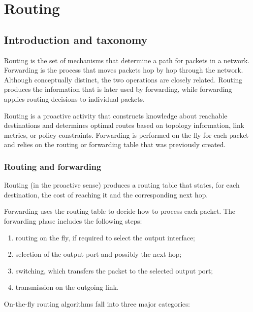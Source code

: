 \chapter{Routing}

\section{Introduction and taxonomy}

Routing is the set of mechanisms that determine a path for packets in a network. Forwarding is the process that moves packets hop by hop through the network. Although conceptually distinct, the two operations are closely related. Routing produces the information that is later used by forwarding, while forwarding applies routing decisions to individual packets.

Routing is a proactive activity that constructs knowledge about reachable destinations and determines optimal routes based on topology information, link metrics, or policy constraints. Forwarding is performed on the fly for each packet and relies on the routing or forwarding table that was previously created.

\subsection{Routing and forwarding}

Routing (in the proactive sense) produces a routing table that states, for each destination, the cost of reaching it and the corresponding next hop.

\begin{center}
\end{center}

Forwarding uses the routing table to decide how to process each packet. The forwarding phase includes the following steps:

\begin{enumerate}
\item routing on the fly, if required to select the output interface;
\item selection of the output port and possibly the next hop;
\item switching, which transfers the packet to the selected output port;
\item transmission on the outgoing link.
\end{enumerate}

On-the-fly routing algorithms fall into three major categories:

